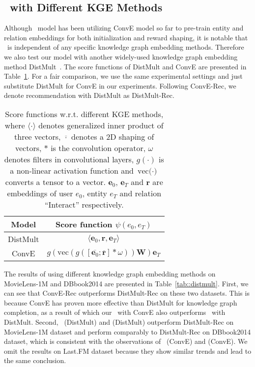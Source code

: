\subsection{\name\ with Different KGE Methods}\label{sec::distmult}
Although \name\ model has been utilizing ConvE model so far to pre-train entity and relation embeddings for both initialization and reward shaping, it is notable that \name\ is independent of any specific knowledge graph embedding methods. 
Therefore we also test our model with another widely-used knowledge graph embedding method DistMult~\cite{yang2014embedding}. The score functions of DistMult and ConvE are presented in Table~\ref{tab::score_func}. For a fair comparison, we use the same experimental settings and just substitute DistMult for ConvE in our experiments. Following ConvE-Rec, we denote recommendation with DistMult as DistMult-Rec.



\begin{table}[t]
    \centering
    \begin{tabular}{cc}
    \toprule
        Model & Score function $\psi(e_0, e_T)$  \\
        \midrule
        DistMult & $\langle \mathbf{e}_0, \mathbf{r}, \mathbf{e}_T \rangle$ \\
        ConvE & $g(\text{vec}(g([\overline{\mathbf{e}_0};\overline{\mathbf{r}}]* \omega)) \mathbf{W})\mathbf{e}_T$ \\
    \bottomrule
    \end{tabular}
    \caption{Score functions w.r.t. different KGE methods, where $\langle \cdot \rangle$ denotes generalized inner product of three vectors, $\overline{\cdot}$ denotes a 2D shaping of vectors, $*$ is the convolution operator, $\omega$ denotes filters in convolutional layers, $g(\cdot)$ is a non-linear activation function and $\text{vec($\cdot$)}$ converts a tensor to a vector. $\mathbf{e}_0$, $\mathbf{e}_T$ and $\mathbf{r}$ are embeddings of user $e_0$, entity $e_T$ and relation ``Interact'' respectively.}
\label{tab::score_func}
\end{table}

The results of using different knowledge graph embedding methods on MovieLens-1M and DBbook2014 are presented in Table~\ref{tab::distmult}. First, we can see that ConvE-Rec outperforms DistMult-Rec on these two datasets. This is because ConvE has proven more effective than DistMult for knowledge graph completion, as a result of which our \name\ with ConvE also outperforms \name\ with DistMult. Second, \name\ (DistMult) and \name* (DistMult) outperform DistMult-Rec on MovieLens-1M dataset and perform comparably to DistMult-Rec on DBbook2014 dataset, which is consistent with the observations of \name\ (ConvE) and \name* (ConvE). We omit the results on Last.FM dataset because they show similar trends and lead to the same conclusion.










